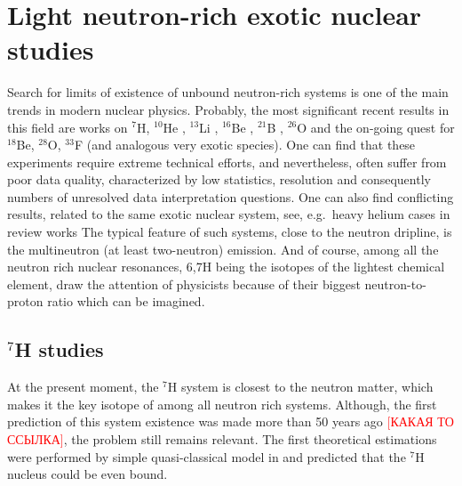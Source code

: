 \section{Light neutron-rich exotic nuclear studies}

Search for limits of existence of unbound neutron-rich systems is one of the main trends in modern nuclear physics.
Probably, the most significant recent results in this field are works on $^{7}$H, $^{10}$He \cite{Sidorchuk:2012,Kohley:2012,Jones:2015,Matta:2015}, $^{13}$Li \cite{Johansson:2010a,Kohley:2013b}, $^{16}$Be \cite{Spyrou:2012}, $^{21}$B \cite{Leblond:2018}, $^{26}$O \cite{Kohley:2013,Caesar:2013,Kondo:2016} and the on-going quest for $^{18}$Be, $^{28}$O, $^{33}$F \cite{Ahn:2019} (and analogous very exotic species). 
One can find that these experiments require extreme technical efforts, and nevertheless, often suffer from poor data quality, characterized by low statistics, resolution and consequently numbers of unresolved data interpretation questions.
One can also find conflicting results, related to the same exotic nuclear system, see, e.g.\ heavy helium cases in review works \cite{Grigorenko:2016,Fortune:2018}
The typical feature of such systems, close to the neutron dripline, is the multineutron (at least two-neutron) emission.
And of course, among all the neutron rich nuclear resonances, 6,7H being the isotopes of the lightest chemical element, draw the attention of physicists because of their biggest neutron-to-proton ratio which can be imagined.

\subsection{$^{7}$H studies}

At the present moment, the $^{7}$H system is closest to the neutron matter, which makes it the key isotope of among all neutron rich systems. 
Although, the first prediction of this system existence was made more than 50 years ago \textcolor{red}{[КАКАЯ ТО ССЫЛКА]}, the problem still remains relevant.
The first theoretical estimations were performed by simple quasi-classical model in \cite{Baz:1972} and predicted that the $^{7}$H nucleus could be even bound.

